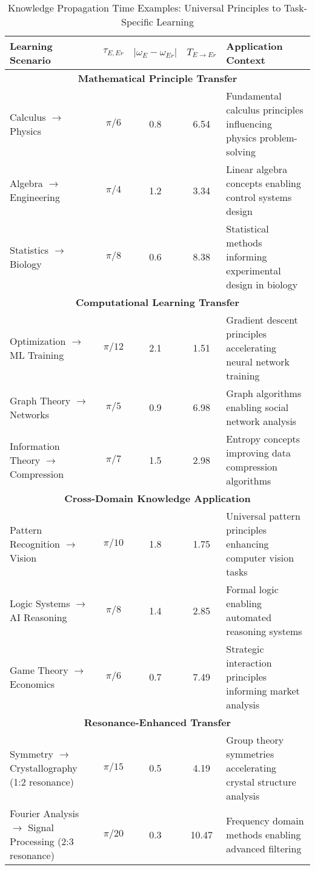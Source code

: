 \begin{table}[ht]
\centering
\caption{Knowledge Propagation Time Examples: Universal Principles to Task-Specific Learning}
\footnotesize
\begin{tabular}{|p{3.5cm}|c|c|c|p{4cm}|}
\hline
\textbf{Learning Scenario} & \textbf{$\tau_{E,Er}$} & \textbf{$|\omega_E - \omega_{Er}|$} & \textbf{$T_{E \to Er}$} & \textbf{Application Context} \\
\hline
\hline
\multicolumn{5}{|c|}{\textbf{Mathematical Principle Transfer}} \\
\hline
Calculus $\to$ Physics & $\pi/6$ & 0.8 & 6.54 & Fundamental calculus principles influencing physics problem-solving \\
\hline
Algebra $\to$ Engineering & $\pi/4$ & 1.2 & 3.34 & Linear algebra concepts enabling control systems design \\
\hline
Statistics $\to$ Biology & $\pi/8$ & 0.6 & 8.38 & Statistical methods informing experimental design in biology \\
\hline
\hline
\multicolumn{5}{|c|}{\textbf{Computational Learning Transfer}} \\
\hline
Optimization $\to$ ML Training & $\pi/12$ & 2.1 & 1.51 & Gradient descent principles accelerating neural network training \\
\hline
Graph Theory $\to$ Networks & $\pi/5$ & 0.9 & 6.98 & Graph algorithms enabling social network analysis \\
\hline
Information Theory $\to$ Compression & $\pi/7$ & 1.5 & 2.98 & Entropy concepts improving data compression algorithms \\
\hline
\hline
\multicolumn{5}{|c|}{\textbf{Cross-Domain Knowledge Application}} \\
\hline
Pattern Recognition $\to$ Vision & $\pi/10$ & 1.8 & 1.75 & Universal pattern principles enhancing computer vision tasks \\
\hline
Logic Systems $\to$ AI Reasoning & $\pi/8$ & 1.4 & 2.85 & Formal logic enabling automated reasoning systems \\
\hline
Game Theory $\to$ Economics & $\pi/6$ & 0.7 & 7.49 & Strategic interaction principles informing market analysis \\
\hline
\hline
\multicolumn{5}{|c|}{\textbf{Resonance-Enhanced Transfer}} \\
\hline
Symmetry $\to$ Crystallography (1:2 resonance) & $\pi/15$ & 0.5 & 4.19 & Group theory symmetries accelerating crystal structure analysis \\
\hline
Fourier Analysis $\to$ Signal Processing (2:3 resonance) & $\pi/20$ & 0.3 & 10.47 & Frequency domain methods enabling advanced filtering \\

\end{tabular}
\end{table}
